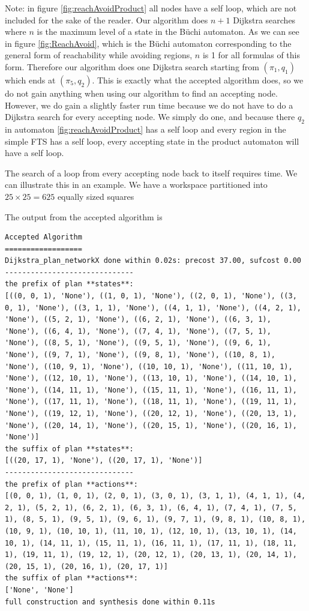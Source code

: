 Note: in figure \ref{fig:reachAvoidProduct} all nodes have a self loop, which are not included for the sake of the reader.
Our algorithm does $n+1$ Dijkstra searches where $n$ is the maximum level of a state in the B\"{u}chi automaton. As we can see in figure \ref{fig:ReachAvoid}, which is the B\"{u}chi automaton corresponding to the general form of reachability while avoiding regions, $n$ is 1 for all formulas of this form. Therefore our algorithm does one Dijkstra search starting from $(\pi_1,q_1)$ which ends at $(\pi_5,q_2)$. This is exactly what the accepted algorithm does, so we do not gain anything when using our algorithm to find an accepting node. However, we do gain a slightly faster run time because we do not have to do a Dijkstra search for every accepting node. We simply do one, and because there $q_2$ in automaton \ref{fig:reachAvoidProduct} has a self loop and every region in the simple FTS has a self loop, every accepting state in the product automaton will have a self loop.

The search of a loop from every accepting node back to itself requires time. We can illustrate this in an example. We have a workspace partitioned into $25 \times 25 = 625$ equally sized squares



The output from the accepted algorithm is

\begingroup
\fontsize{9pt}{12pt}\selectfont
\begin{lstlisting}
Accepted Algorithm
==================
Dijkstra_plan_networkX done within 0.02s: precost 37.00, sufcost 0.00
------------------------------
the prefix of plan **states**:
[((0, 0, 1), 'None'), ((1, 0, 1), 'None'), ((2, 0, 1), 'None'), ((3, 0, 1), 'None'), ((3, 1, 1), 'None'), ((4, 1, 1), 'None'), ((4, 2, 1), 'None'), ((5, 2, 1), 'None'), ((6, 2, 1), 'None'), ((6, 3, 1), 'None'), ((6, 4, 1), 'None'), ((7, 4, 1), 'None'), ((7, 5, 1), 'None'), ((8, 5, 1), 'None'), ((9, 5, 1), 'None'), ((9, 6, 1), 'None'), ((9, 7, 1), 'None'), ((9, 8, 1), 'None'), ((10, 8, 1), 'None'), ((10, 9, 1), 'None'), ((10, 10, 1), 'None'), ((11, 10, 1), 'None'), ((12, 10, 1), 'None'), ((13, 10, 1), 'None'), ((14, 10, 1), 'None'), ((14, 11, 1), 'None'), ((15, 11, 1), 'None'), ((16, 11, 1), 'None'), ((17, 11, 1), 'None'), ((18, 11, 1), 'None'), ((19, 11, 1), 'None'), ((19, 12, 1), 'None'), ((20, 12, 1), 'None'), ((20, 13, 1), 'None'), ((20, 14, 1), 'None'), ((20, 15, 1), 'None'), ((20, 16, 1), 'None')]
the suffix of plan **states**:
[((20, 17, 1), 'None'), ((20, 17, 1), 'None')]
------------------------------
the prefix of plan **actions**:
[(0, 0, 1), (1, 0, 1), (2, 0, 1), (3, 0, 1), (3, 1, 1), (4, 1, 1), (4, 2, 1), (5, 2, 1), (6, 2, 1), (6, 3, 1), (6, 4, 1), (7, 4, 1), (7, 5, 1), (8, 5, 1), (9, 5, 1), (9, 6, 1), (9, 7, 1), (9, 8, 1), (10, 8, 1), (10, 9, 1), (10, 10, 1), (11, 10, 1), (12, 10, 1), (13, 10, 1), (14, 10, 1), (14, 11, 1), (15, 11, 1), (16, 11, 1), (17, 11, 1), (18, 11, 1), (19, 11, 1), (19, 12, 1), (20, 12, 1), (20, 13, 1), (20, 14, 1), (20, 15, 1), (20, 16, 1), (20, 17, 1)]
the suffix of plan **actions**:
['None', 'None']
full construction and synthesis done within 0.11s
\end{lstlisting}
\endgroup

